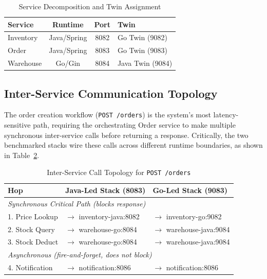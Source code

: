 \documentclass[conference]{IEEEtran}
\begin{document}
\begin{table}[htbp]
\caption{Service Decomposition and Twin Assignment}
\begin{center}
\begin{tabular}{|l|c|c|l|}
\hline
\textbf{Service} & \textbf{Runtime} & \textbf{Port} & \textbf{Twin} \\
\hline
Inventory & Java/Spring & 8082 & Go Twin (9082) \\
Order     & Java/Spring & 8083 & Go Twin (9083) \\
Warehouse & Go/Gin      & 8084 & Java Twin (9084) \\
\hline
\end{tabular}
\label{tab:services}
\end{center}
\end{table}

\subsection{Inter-Service Communication Topology}

The order creation workflow (\texttt{POST /orders}) is the system's most latency-sensitive path, requiring the orchestrating Order service to make multiple synchronous inter-service calls before returning a response. Critically, the two benchmarked stacks wire these calls across different runtime boundaries, as shown in Table~\ref{fig:topology}.

\begin{table}[htbp]
\caption{Inter-Service Call Topology for \texttt{POST /orders}}
\begin{center}
\begin{tabular}{|l|l|l|}
\hline
\textbf{Hop} & \textbf{Java-Led Stack (8083)} & \textbf{Go-Led Stack (9083)} \\
\hline
\multicolumn{3}{|l|}{\textit{Synchronous Critical Path (blocks response)}} \\
\hline
1. Price Lookup  & $\rightarrow$ inventory-java:8082 & $\rightarrow$ inventory-go:9082 \\
2. Stock Query   & $\rightarrow$ warehouse-go:8084  & $\rightarrow$ warehouse-java:9084 \\
3. Stock Deduct  & $\rightarrow$ warehouse-go:8084  & $\rightarrow$ warehouse-java:9084 \\
\hline
\multicolumn{3}{|l|}{\textit{Asynchronous (fire-and-forget, does not block)}} \\
\hline
4. Notification  & $\rightarrow$ notification:8086  & $\rightarrow$ notification:8086 \\
\hline
\end{tabular}
\label{fig:topology}
\end{center}
\end{table}
\end{document}
